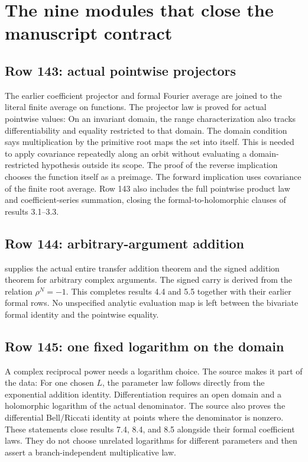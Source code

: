 \section{The nine modules that close the manuscript contract}
\subsection{Row 143: actual pointwise projectors}
The earlier coefficient projector and formal Fourier average are joined to the literal finite average on functions.
The projector law is proved for actual pointwise values:
On an invariant domain, the range characterization also tracks differentiability and equality restricted to that domain.
The domain condition says multiplication by the primitive root maps the set into itself. This is needed to apply covariance repeatedly along an orbit without evaluating a domain-restricted hypothesis outside its scope. The proof of the reverse implication chooses the function itself as a preimage. The forward implication uses covariance of the finite root average. Row 143 also includes the full pointwise product law and coefficient-series summation, closing the formal-to-holomorphic clauses of results 3.1--3.3.

\subsection{Row 144: arbitrary-argument addition}
 supplies the actual entire transfer addition theorem and the signed addition theorem for arbitrary complex arguments. The signed carry is derived from the relation $\rho^N=-1$. This completes results 4.4 and 5.5 together with their earlier formal rows. No unspecified analytic evaluation map is left between the bivariate formal identity and the pointwise equality.

\subsection{Row 145: one fixed logarithm on the domain}
A complex reciprocal power needs a logarithm choice. The source makes it part of the data:
For one chosen $L$, the parameter law follows directly from the exponential addition identity.
Differentiation requires an open domain and a holomorphic logarithm of the actual denominator.
The source also proves the differential Bell/Riccati identity at points where the denominator is nonzero. These statements close results 7.4, 8.4, and 8.5 alongside their formal coefficient laws. They do not choose unrelated logarithms for different parameters and then assert a branch-independent multiplicative law.

